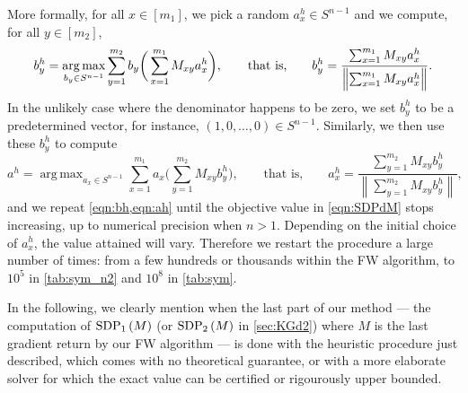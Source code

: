 \documentclass[10pt,aps,notitlepage,onecolumn,pra,superscriptaddress]{revtex4-1}
\DeclareMathOperator*{\argmax}{arg\,max}
\newcommand\sdp[2]{\mathrm{SDP}_{#1}\ifx#2\empty\else\left({#2}\right)\fi}
\begin{document}
More formally, for all $x\in[m_1]$, we pick a random $a^h_x\in S^{n-1}$ and we compute, for all $y\in[m_2]$,
\begin{equation}
  b^h_y = \argmax_{b_y\in S^{n-1}} \sum_{y=1}^{m_2} b_y \bigg(\sum_{x=1}^{m_1} M_{xy}a^h_x\bigg),\qquad\text{that is,}\qquad b^h_y = \frac{\sum_{\vphantom{y}x=1}^{m_1} M_{xy}a^h_x}{\left\|\sum_{\vphantom{y}x=1}^{m_1} M_{xy}a^h_x\right\|}.
  \label{eqn:bh}
\end{equation}
In the unlikely case where the denominator happens to be zero, we set $b^h_y$ to be a predetermined vector, for instance, $(1,0,\ldots,0)\in S^{n-1}$.
Similarly, we then use these $b^h_y$ to compute
\begin{equation}
  a^h = \argmax_{a_x\in S^{n-1}} \sum_{x=1}^{m_1} a_x \bigg(\sum_{y=1}^{m_2} M_{xy}b^h_y\bigg),\qquad\text{that is,}\qquad a^h_x = \frac{\sum_{y=1}^{m_2} M_{xy}b^h_y}{\left\|\sum_{y=1}^{m_2} M_{xy}b^h_y\right\|},
  \label{eqn:ah}
\end{equation}
and we repeat \cref{eqn:bh,eqn:ah} until the objective value in \cref{eqn:SDPdM} stops increasing, up to numerical precision when $n>1$.
Depending on the initial choice of $a^h_x$, the value attained will vary.
Therefore we restart the procedure a large number of times: from a few hundreds or thousands within the FW algorithm, to $10^5$ in \cref{tab:sym_n2} and $10^8$ in \cref{tab:sym}.

In the following, we clearly mention when the last part of our method --- the computation of $\sdp{1}{M}$ (or $\sdp{2}{M}$ in \cref{sec:KGd2}) where $M$ is the last gradient return by our FW algorithm --- is done with the heuristic procedure just described, which comes with no theoretical guarantee, or with a more elaborate solver for which the exact value can be certified or rigourously upper bounded.
\end{document}
